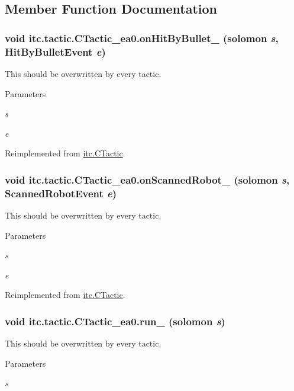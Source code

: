 \subsection{Member Function Documentation}
\hypertarget{classitc_1_1tactic_1_1_c_tactic__ea0_a66859754a34c07f83a114509a86914cb}{
\subsubsection[{onHitByBullet\_\-}]{\setlength{\rightskip}{0pt plus 5cm}void itc.tactic.CTactic\_\-ea0.onHitByBullet\_\- ({\bf solomon} {\em s}, \/  HitByBulletEvent {\em e})}}
\label{classitc_1_1tactic_1_1_c_tactic__ea0_a66859754a34c07f83a114509a86914cb}
This should be overwritten by every tactic. 
\begin{DoxyParams}{Parameters}
\item[{\em s}]\item[{\em e}]\end{DoxyParams}


Reimplemented from \hyperlink{classitc_1_1_c_tactic_a9a8d125f826667459758f2767c3bd957}{itc.CTactic}.\hypertarget{classitc_1_1tactic_1_1_c_tactic__ea0_a64e0ac47db137d34d3c52abbde65917f}{
\subsubsection[{onScannedRobot\_\-}]{\setlength{\rightskip}{0pt plus 5cm}void itc.tactic.CTactic\_\-ea0.onScannedRobot\_\- ({\bf solomon} {\em s}, \/  ScannedRobotEvent {\em e})}}
\label{classitc_1_1tactic_1_1_c_tactic__ea0_a64e0ac47db137d34d3c52abbde65917f}
This should be overwritten by every tactic. 
\begin{DoxyParams}{Parameters}
\item[{\em s}]\item[{\em e}]\end{DoxyParams}


Reimplemented from \hyperlink{classitc_1_1_c_tactic_a63a5a64ff30293061e37eca71fb77a96}{itc.CTactic}.\hypertarget{classitc_1_1tactic_1_1_c_tactic__ea0_af5b367f093ebea65ef06b41b03432289}{
\subsubsection[{run\_\-}]{\setlength{\rightskip}{0pt plus 5cm}void itc.tactic.CTactic\_\-ea0.run\_\- ({\bf solomon} {\em s})}}
\label{classitc_1_1tactic_1_1_c_tactic__ea0_af5b367f093ebea65ef06b41b03432289}
This should be overwritten by every tactic. 
\begin{DoxyParams}{Parameters}
\item[{\em s}]\end{DoxyParams}


